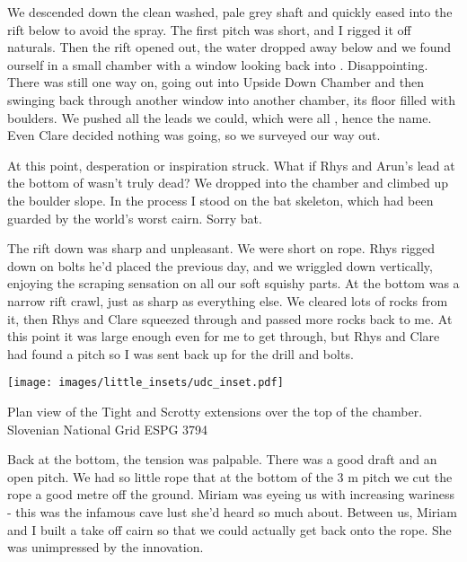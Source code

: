 
We descended down the clean washed, pale grey shaft and quickly eased into the rift below to avoid the spray. The first pitch was short, and I rigged it off naturals. Then the rift opened out, the water dropped away below and we found ourself in a small chamber with a window looking back into . Disappointing. There was still one way on, going out into Upside Down Chamber and then swinging back through another window into another chamber, its floor filled with boulders. We pushed all the leads we could, which were all , hence the name. Even Clare decided nothing was going, so we surveyed our way out.
 
At this point, desperation or inspiration struck. What if Rhys and Arun’s lead at the bottom of  wasn’t truly dead? We dropped into the chamber and climbed up the boulder slope. In the process I stood on the bat skeleton, which had been guarded by the world’s worst cairn. Sorry bat.
 
The rift down was sharp and unpleasant. We were short on rope. Rhys rigged down on bolts he’d placed the previous day, and we wriggled down vertically, enjoying the scraping sensation on all our soft squishy parts. At the bottom was a narrow rift crawl, just as sharp as everything else. We cleared lots of rocks from it, then Rhys and Clare squeezed through and passed more rocks back to me. At this point it was large enough even for me to get through, but Rhys and Clare had found a pitch so I was sent back up for the drill and bolts.
 
 \begin{marginfigure}
 	\checkoddpage \ifoddpage \forcerectofloat \else \forceversofloat \fi
 	\centering
 	\texttt{[image: images/little\_insets/udc\_inset.pdf]}
 	\caption{Plan view of the Tight and Scrotty extensions over the top of the \protect{} chamber. Slovenian National Grid ESPG 3794}
 	\label{Upside Down inset}
 \end{marginfigure}
 
Back at the bottom, the tension was palpable. There was a good draft and an open pitch. We had so little rope that at the bottom of the 3 m pitch we cut the rope a good metre off the ground. Miriam was eyeing us with increasing wariness - this was the infamous cave lust she’d heard so much about. Between us, Miriam and I built a take off cairn so that we could actually get back onto the rope. She was unimpressed by the innovation.
 
